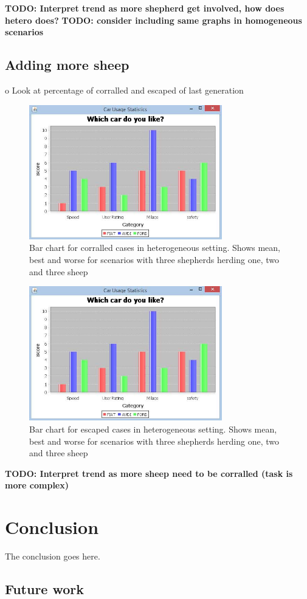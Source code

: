 \documentclass[conference]{IEEEtran}
\begin{document}
\textbf{TODO: Interpret trend as more shepherd get involved, how does hetero does?}
\textbf{TODO: consider including same graphs in homogeneous scenarios}


\subsection{Adding more sheep}
o	Look at percentage of corralled and escaped of last generation


\begin{figure}[ht]
	\centering
	\includegraphics[width=3.3in]{imgs/barchart.jpg}
	\caption{Bar chart for corralled cases in heterogeneous setting. Shows mean, best and worse for scenarios with three shepherds herding one, two and three sheep}
	\label{fig:corralled_threeShepherd}
\end{figure}

\begin{figure}[ht]
	\centering
	\includegraphics[width=3.3in]{imgs/barchart.jpg}
	\caption{Bar chart for escaped cases in heterogeneous setting. Shows mean, best and worse for scenarios with three shepherds herding one, two and three sheep}
	\label{fig:escaped_threeShepherd}
\end{figure}

\textbf{TODO: Interpret trend as more sheep need to be corralled (task is more complex)}


\section{Conclusion}
The conclusion goes here.

\subsection{Future work}






\end{document}
